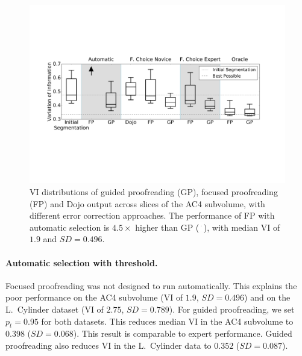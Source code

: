 \begin{figure}[t]
\centering
\includegraphics[width=\linewidth]{gfx/ac4boxplot.pdf}
\caption{VI distributions of guided proofreading (GP), focused proofreading (FP) and Dojo output across slices of the AC4 subvolume, with different error correction approaches. The performance of FP with automatic selection is $4.5\times$ higher than GP (\protect\includegraphics[width=0.2cm]{gfx/arrow.pdf}), with median VI of $1.9$ and $SD=0.496$.}
\label{fig:ac4boxplot}
\end{figure}

\paragraph{Automatic selection with threshold.} Focused proofreading was not designed to run automatically. This explains the poor performance on the AC4 subvolume (VI of $1.9$, $SD=0.496$) and on the L.~Cylinder dataset (VI of $2.75$, $SD=0.789$). For guided proofreading, we set $p_t=0.95$ for both datasets. This reduces median VI in the AC4 subvolume to $0.398$ ($SD=0.068$). This result is comparable to expert performance. Guided proofreading also reduces VI in the L.~Cylinder data to $0.352$ ($SD=0.087$).

